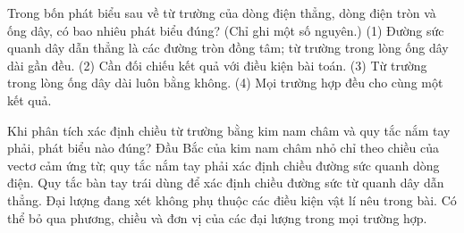 \begin{ex}
Trong bốn phát biểu sau về từ trường của dòng điện thẳng, dòng điện tròn và ống dây, có bao nhiêu phát biểu đúng? (Chỉ ghi một số nguyên.) (1) Đường sức quanh dây dẫn thẳng là các đường tròn đồng tâm; từ trường trong lòng ống dây dài gần đều. (2) Cần đối chiếu kết quả với điều kiện bài toán. (3) Từ trường trong lòng ống dây dài luôn bằng không. (4) Mọi trường hợp đều cho cùng một kết quả.
\end{ex}

\begin{ex}
Khi phân tích xác định chiều từ trường bằng kim nam châm và quy tắc nắm tay phải, phát biểu nào đúng?
\choice
{\True Đầu Bắc của kim nam châm nhỏ chỉ theo chiều của vectơ cảm ứng từ; quy tắc nắm tay phải xác định chiều đường sức quanh dòng điện.}
{Quy tắc bàn tay trái dùng để xác định chiều đường sức từ quanh dây dẫn thẳng.}
{Đại lượng đang xét không phụ thuộc các điều kiện vật lí nêu trong bài.}
{Có thể bỏ qua phương, chiều và đơn vị của các đại lượng trong mọi trường hợp.}
\end{ex}

